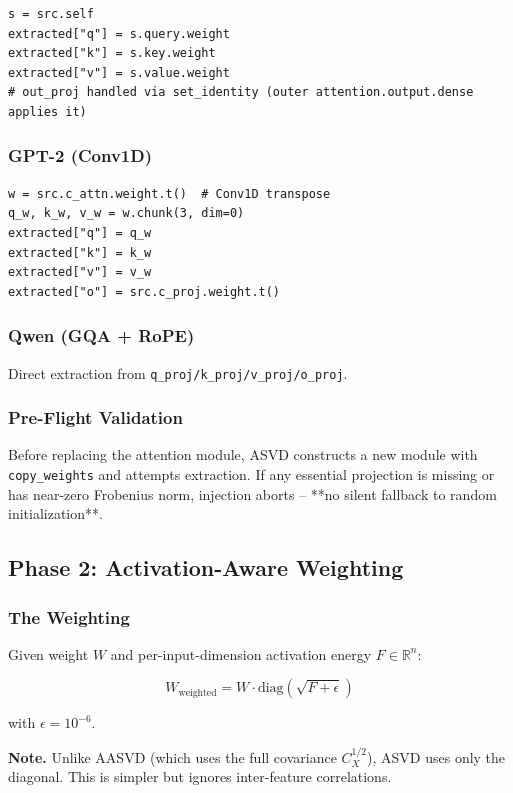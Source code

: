 \begin{lstlisting}
s = src.self
extracted["q"] = s.query.weight
extracted["k"] = s.key.weight
extracted["v"] = s.value.weight
# out_proj handled via set_identity (outer attention.output.dense applies it)
\end{lstlisting}

\subsubsection{GPT-2 (Conv1D)}

\begin{lstlisting}
w = src.c_attn.weight.t()  # Conv1D transpose
q_w, k_w, v_w = w.chunk(3, dim=0)
extracted["q"] = q_w
extracted["k"] = k_w
extracted["v"] = v_w
extracted["o"] = src.c_proj.weight.t()
\end{lstlisting}

\subsubsection{Qwen (GQA + RoPE)}

Direct extraction from \texttt{q\_proj/k\_proj/v\_proj/o\_proj}.

\subsubsection{Pre-Flight Validation}

Before replacing the attention module, ASVD constructs a new module with 
\texttt{copy\_weights} and attempts extraction. If any essential projection is 
missing or has near-zero Frobenius norm, injection aborts -- **no silent 
fallback to random initialization**.

\subsection{Phase 2: Activation-Aware Weighting}

\subsubsection{The Weighting}

Given weight $W$ and per-input-dimension activation energy $F \in \mathbb{R}^n$:

\[
W_\text{weighted} = W \cdot \text{diag}(\sqrt{F + \epsilon})
\]

with $\epsilon = 10^{-6}$.

\textbf{Note.} Unlike AASVD (which uses the full covariance $C_X^{1/2}$), ASVD 
uses only the diagonal. This is simpler but ignores inter-feature 
correlations.


